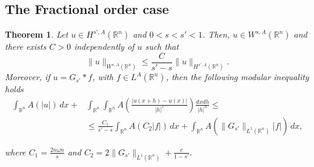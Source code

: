 \documentclass[leqno,twoside, 12pt]{amsart}
\theoremstyle{plain}
\numberwithin{equation}{section} \numberwithin{figure}{section}
\newtheorem{theorem}{Theorem}[section]
\theoremstyle{definition}
\newcommand{\R}{\mathbb R}
\numberwithin{equation}{section}
\begin{document}
\subsection{The Fractional order case}
\begin{theorem} \label{teo.s1}
Let $u\in H^{s',A}(\R^n)$ and $0<s<s'<1$. Then, $u\in W^{s, A}(\R^n)$ and there exists $C>0$ independently of $u$ such that
$$
\|u\|_{W^{s,A}(\R^n)} \leq \frac{C}{s'-s} \|u\|_{H^{s',A}(\R^n)}.
$$
Moreover, if $u=G_{s'}* f$, with $f\in L^A(\R^n)$, then the following modular inequality holds
\begin{align*}
\int_{\R^n} A(|u|)\,dx +&\int_{\R^n}\int_{\R^n}  A\left(\frac{|u(x+h)-u(x)|}{|h|^s}\right)\frac{dxdh}{|h|^n}\leq \\
&\leq  \frac{C_1}{s'-s} \int_{\R^n} A(C_2|f|)\,dx +  \int_{\R^n} A(\|G_{s'}\|_{L^1(\R^n)}|f|)\,dx,
\end{align*}

where $C_1=\frac{2n\omega n}{s}$ and $C_2=2\|G_{s'}\|_{L^1(\R^n)} + \frac{c}{1-s'}$.
\end{theorem}
\end{document}

